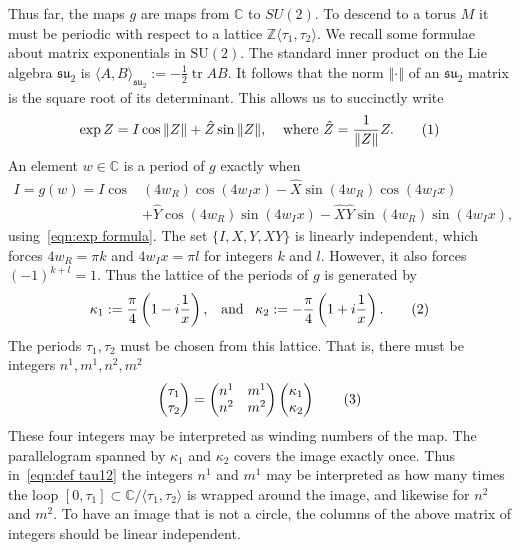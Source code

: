 \documentclass{article}
\numberwithin{equation}{section}
\numberwithin{figure}{section}
\newcommand{\labelthis}[1]{\addtocounter{equation}{1}\tag{\theequation}\label{#1}}
\newcommand{\bra}[1]{\left(#1\right)}
\newcommand{\norm}[1]{{\left\Vert#1\right\Vert}}
\DeclareMathOperator*{\tr}{tr}
\newcommand{\iu}{i}
\newcommand{\Z}{\mathbb{Z}}
\newcommand{\C}{\mathbb{C}}
\newcommand{\SU}{\mathrm{SU}}
\newcommand{\su}{\mathfrak{su}}
\begin{document}
Thus far, the maps $g$ are maps from $\C$ to $SU(2)$. To descend to a torus $M$ it must be periodic with respect to a lattice $\Z\langle \tau_1,\tau_2\rangle$. We recall some formulae about matrix exponentials in $\SU(2)$. The standard inner product on the Lie algebra $\su_2$ is $\langle A, B \rangle_{\su_2} := -\tfrac{1}{2}\tr AB$. It follows that the norm $\norm{\cdot}$ of an $\su_2$ matrix is the square root of its determinant. This allows us to succinctly write 
\[
    \exp Z = I \cos \norm{Z} + \hat{Z} \sin \norm{Z},
    \;\;\;\;
    \text{where }\hat{Z} = \frac{1}{\norm{Z}} Z.
\labelthis{eqn:exp formula}
\]
An element $w\in\C$ is a period of $g$ exactly when
\begin{align*}
I = g(w) = I \cos&(4 w_R)\cos(4 w_I x)
- \hat{X}\sin(4 w_R)\cos(4 w_I x) \\
&+ \hat{Y}\cos(4 w_R)\sin(4 w_I x)
- \hat{X}\hat{Y}\sin(4w_R)\sin(4 w_I x),
\end{align*}
using~\eqref{eqn:exp formula}. The set $\{I,X,Y,XY\}$ is linearly independent, which forces 
$4w_R = \pi k$ and $4 w_I x = \pi l$ for integers $k$ and $l$. However, it also forces $(-1)^{k+l} = 1$.
Thus the lattice of the periods of $g$ is generated by
\[
\kappa_1 := \frac{\pi}{4}\bra{1 - \iu\frac{1}{x}},
\;\;\;\text{and}\;\;\;
\kappa_2 := -\frac{\pi}{4}\bra{1 + \iu\frac{1}{x}}.
\labelthis{eqn:def kappa12}
\]
The periods $\tau_1,\tau_2$ must be chosen from this lattice.
That is, there must be integers $n^1,m^1,n^2,m^2$
\[
\begin{pmatrix}
\tau_1 \\ \tau_2
\end{pmatrix}
= 
\begin{pmatrix}
n^1 & m^1 \\
n^2 & m^2
\end{pmatrix}
\begin{pmatrix}
\kappa_1 \\ \kappa_2
\end{pmatrix}
\labelthis{eqn:def tau12}
\]
These four integers may be interpreted as winding numbers of the map. The parallelogram spanned by $\kappa_1$ and $\kappa_2$ covers the image exactly once. Thus in~\eqref{eqn:def tau12} the integers $n^1$ and $m^1$ may be interpreted as how many times the loop $[0,\tau_1] \subset \C/\langle \tau_1,\tau_2 \rangle$ is wrapped around the image, and likewise for $n^2$ and $m^2$.
To have an image that is not a circle, the columns of the above matrix of integers should be linear independent. 
\end{document}

